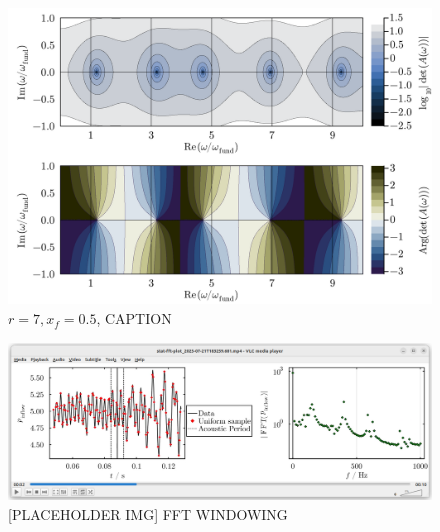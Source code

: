 \begin{figure}[t]
\centering
\includegraphics[scale=0.35]{assets/graphs/r=7_xf=05_complex_harmonics.pdf}
\caption{$r = 7, x_f = 0.5$, CAPTION}
\label{fig:flame-harmonics-complex}
\end{figure}














\begin{figure}[t]
\centering
\includegraphics[scale=0.35]{assets/graphs/fft-windowing.png}
\caption{[PLACEHOLDER IMG] FFT WINDOWING}
\label{fig:windowing}
\end{figure}

